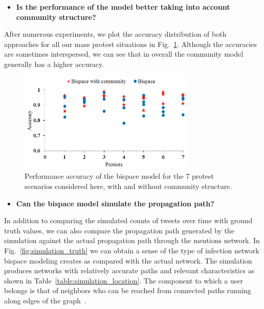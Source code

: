 \begin{itemize}
  \item \textbf{Is the performance of the model better
taking into account community structure?}
\end{itemize}
After numerous experiments, we plot the accuracy distribution of both approaches for all our mass protest situations
in Fig.~\ref{fig:GBM_compare_community}. Although the accuracies are
sometimes interspersed, we can see that in overall
the community model generally has a higher accuracy.

\begin{figure}[ht]
\centering
\includegraphics[width=3.3in] {figures/GBM_compare_community.png}
\caption{Performance accuracy of the bispace model for the 7
protest scenarios considered here,
with and without community structure.}
\label{fig:GBM_compare_community}
\end{figure}


\begin{itemize}
  \item \textbf{Can the bispace model simulate the propagation path?}
\end{itemize}
In addition to comparing the simulated counts of tweets over time with ground truth values, we can also compare the propagation path generated by the simulation against the actual propagation path
through the mentions network. In Fig.~\ref{fig:simulation_truth} we can
obtain a sense of the type of infection network bispace modeling creates as
compared with the actual network. The simulation produces networks with relatively accurate paths and relevant characteristics as shown in Table~\ref{table:simulation_location}. The component to which a user belongs is that of neighbors who can be reached from connected paths running along edges of the graph~\cite{newman2003structure}.


